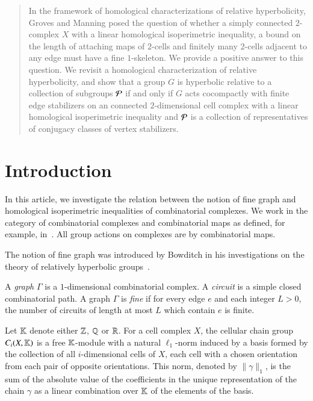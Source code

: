 \maketitle

\begin{abstract}
In the framework of homological characterizations of relative hyperbolicity,  Groves and Manning posed the question of whether  a simply connected $2$-complex $X$ with a  linear homological  isoperimetric inequality, a bound on the length of attaching maps of $2$-cells  and finitely many $2$-cells adjacent to any edge must have a fine $1$-skeleton.  We provide a positive answer to this question.  We revisit a homological characterization of relative hyperbolicity, and show that a group $G$ is hyperbolic relative to a collection of subgroups $\mathcal P$ if and only if $G$ acts cocompactly with finite edge stabilizers on an connected $2$-dimensional cell complex with a linear homological isoperimetric inequality and $\mathcal P$ is a collection of representatives  of conjugacy classes of vertex stabilizers.
\end{abstract}

\section{Introduction}

In this article, we investigate  the relation between the notion of fine graph and homological isoperimetric inequalities of combinatorial complexes. 
We work in the category of combinatorial complexes and combinatorial maps as defined, for example, in~\cite[Chapter I.8, Appendix]{BrHa99}.  All group actions on complexes are by combinatorial maps.

The notion of fine graph was introduced by Bowditch in his investigations on the theory of relatively hyperbolic groups~\cite{Bo12}. 

\begin{definition}
A \emph{graph} $\Gamma$ is a $1$-dimensional combinatorial complex.   A \emph{circuit} is a simple closed combinatorial path. A graph $\Gamma$ is \emph{fine} if for every edge $e$ and each integer $L>0$, the number of circuits of length at most $L$ which contain $e$ is finite.  
\end{definition}

Let $\mathbb{K}$ denote either $\mathbb{Z}$, $\mathbb{Q}$ or $\mathbb{R}$.   For a cell complex $X$, the cellular chain group $C_i(X, \mathbb{K})$  is a free $\mathbb{K}$-module  with a natural $\ell_1$-norm induced by a basis formed by the collection of all $i$-dimensional cells of $X$, each cell with a chosen orientation from each pair of opposite orientations. This norm, denoted by $\|\gamma\|_1$, is the sum of the absolute value of the coefficients in the unique representation of the chain $\gamma$ as a linear combination over $\mathbb{K}$ of the elements of the basis. 

